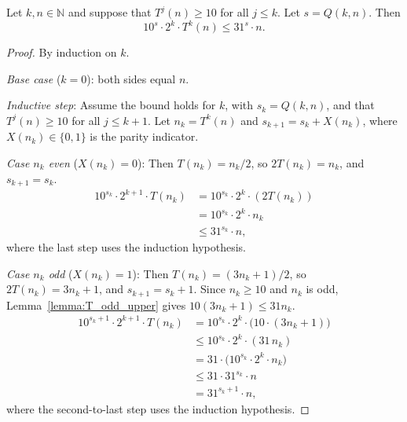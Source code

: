 \begin{lemma}\label{lemma:T_iter_bound}\leanok
Let $k, n \in \mathbb{N}$ and suppose that $T^j(n) \ge 10$ for all $j \le k$.
Let $s = Q(k, n)$. Then
\[
  10^s \cdot 2^k \cdot T^k(n) \le 31^s \cdot n.
\]
\end{lemma}
\begin{proof}\leanok
By induction on $k$.

\emph{Base case} ($k = 0$): both sides equal $n$.

\emph{Inductive step}: Assume the bound holds for $k$, with $s_k = Q(k,n)$, and that $T^j(n) \ge 10$ for all $j \le k+1$.
Let $n_k = T^k(n)$ and $s_{k+1} = s_k + X(n_k)$, where $X(n_k) \in \{0,1\}$ is the parity indicator.

\emph{Case $n_k$ even} ($X(n_k) = 0$): Then $T(n_k) = n_k/2$, so $2T(n_k) = n_k$, and $s_{k+1} = s_k$.
\begin{align*}
  10^{s_k} \cdot 2^{k+1} \cdot T(n_k)
  &= 10^{s_k} \cdot 2^k \cdot (2 T(n_k)) \\
  &= 10^{s_k} \cdot 2^k \cdot n_k \\
  &\le 31^{s_k} \cdot n,
\end{align*}
where the last step uses the induction hypothesis.

\emph{Case $n_k$ odd} ($X(n_k) = 1$): Then $T(n_k) = (3n_k+1)/2$, so $2T(n_k) = 3n_k + 1$, and $s_{k+1} = s_k + 1$.
Since $n_k \ge 10$ and $n_k$ is odd, Lemma~\ref{lemma:T_odd_upper} gives $10(3n_k+1) \le 31 n_k$.
\begin{align*}
  10^{s_k+1} \cdot 2^{k+1} \cdot T(n_k)
  &= 10^{s_k} \cdot 2^k \cdot \bigl(10 \cdot (3n_k + 1)\bigr) \\
  &\le 10^{s_k} \cdot 2^k \cdot (31 \, n_k) \\
  &= 31 \cdot \bigl(10^{s_k} \cdot 2^k \cdot n_k\bigr) \\
  &\le 31 \cdot 31^{s_k} \cdot n \\
  &= 31^{s_k+1} \cdot n,
\end{align*}
where the second-to-last step uses the induction hypothesis.
\end{proof}

